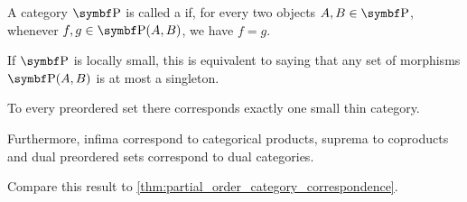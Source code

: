 \begin{definition}\label{def:thin_category}\cite{nLab:thin_category}
  A category \( \Cat{P} \) is called a  if, for every two objects \( A, B \in \Bold{P} \), whenever \( f, g \in \Bold{P}(A, B) \), we have \( f = g \).

  If \( \Cat{P} \) is locally small, this is equivalent to saying that any set of morphisms \( \Bold{P}(A, B) \) is at most a singleton.
\end{definition}

\begin{proposition}\label{thm:preorder_category_correspondence}
  To every preordered set there corresponds exactly one small thin category.

  Furthermore, infima correspond to categorical products, suprema to coproducts and dual preordered sets correspond to dual categories.

  Compare this result to \cref{thm:partial_order_category_correspondence}.
\end{proposition}
